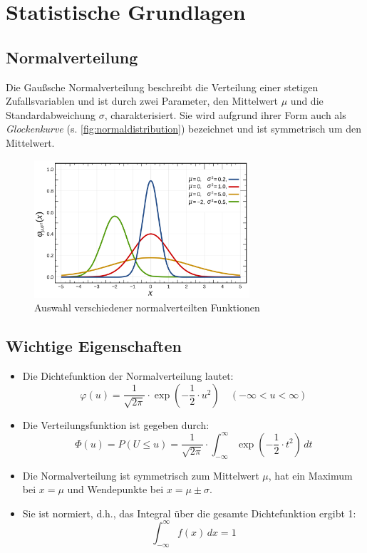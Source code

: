 \section{Statistische Grundlagen}
\label{sec:statistische_grundlagen}

\subsection{Normalverteilung}
\label{sec:normal_distribution}
Die Gaußsche Normalverteilung beschreibt die Verteilung einer stetigen Zufallsvariablen und ist durch zwei Parameter, den Mittelwert $\mu$ und die Standardabweichung $\sigma$, charakterisiert. Sie wird aufgrund ihrer Form auch als \textit{Glockenkurve} (s. \autoref{fig:normaldistribution}) bezeichnet und ist symmetrisch um den Mittelwert.
\begin{figure}[h]
    \centering
    \includegraphics[width=8cm]{Bilder/normal_distribution.png}
    \caption{
        Auswahl verschiedener normalverteilten Funktionen \cite{normaldistribution}}    
    \label{fig:normaldistribution}
\end{figure}
\subsection*{Wichtige Eigenschaften}
\begin{itemize}
    \item Die Dichtefunktion der Normalverteilung lautet:
    \[
    \varphi(u) = \frac{1}{\sqrt{2 \pi}} \cdot \exp\left( -\frac{1}{2} \cdot u^2 \right) \quad (-\infty < u < \infty)
    \]
    \item Die Verteilungsfunktion ist gegeben durch:
    \[
    \Phi(u) = P(U \leq u) = \frac{1}{\sqrt{2 \pi}} \cdot \int_{-\infty}^{\infty} \exp\left( -\frac{1}{2} \cdot t^2 \right) \, dt
    \]
    \item Die Normalverteilung ist symmetrisch zum Mittelwert $\mu$, hat ein Maximum bei $x = \mu$ und Wendepunkte bei $x = \mu \pm \sigma$.
    \item Sie ist normiert, d.h., das Integral über die gesamte Dichtefunktion ergibt 1:
    \[
    \int_{-\infty}^{\infty} f(x) \, dx = 1
    \]
\end{itemize}

